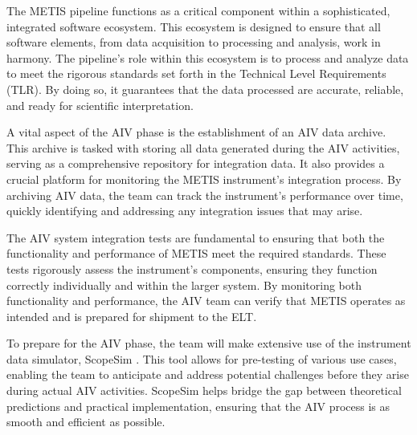 \documentclass[a4paper]{spie}  %
\begin{document}


The METIS pipeline functions as a critical component within a sophisticated, integrated software ecosystem. This ecosystem is designed to ensure that all software elements, from data acquisition to processing and analysis, work in harmony. The pipeline's role within this ecosystem is to process and analyze data to meet the rigorous standards set forth in the Technical Level Requirements (TLR). By doing so, it guarantees that the data processed are accurate, reliable, and ready for scientific interpretation.

A vital aspect of the AIV phase is the establishment of an AIV data archive. This archive is tasked with storing all data generated during the AIV activities, serving as a comprehensive repository for integration data. It also provides a crucial platform for monitoring the METIS instrument's integration process. By archiving AIV data, the team can track the instrument's performance over time, quickly identifying and addressing any integration issues that may arise.

The AIV system integration tests are fundamental to ensuring that both the functionality and performance of METIS meet the required standards. These tests rigorously assess the instrument's components, ensuring they function correctly individually and within the larger system. By monitoring both functionality and performance, the AIV team can verify that METIS operates as intended and is prepared for shipment to the ELT.

To prepare for the AIV phase, the team will make extensive use of the instrument data simulator, ScopeSim \cite{scopesim}. This tool allows for pre-testing of various use cases, enabling the team to anticipate and address potential challenges before they arise during actual AIV activities. ScopeSim helps bridge the gap between theoretical predictions and practical implementation, ensuring that the AIV process is as smooth and efficient as possible.
\end{document}
